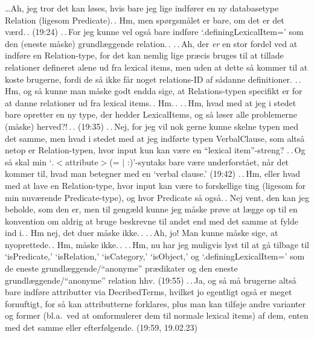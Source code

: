 \documentclass{report}
\begin{document}
\ldots Ah, jeg tror det kan løses, hvis bare jeg lige indfører en ny databasetype Relation (ligesom Predicate).\,. Hm, men spørgsmålet er bare, om det er det værd.\,. (19:24) .\,.\,For jeg kunne vel også bare indføre `.definingLexicalItem=' som den (eneste måske) grundlæggende relation.\,. .\,.\,Ah, der \emph{er} en stor fordel ved at indføre en Relation-type, for det kan nemlig lige præcis bruges til at tillade relationer defineret alene ud fra lexical items, men uden at dette så kommer til at koste brugerne, fordi de så ikke får noget relations-ID af sådanne definitioner. .\,.\,Hm, og så kunne man måske godt endda sige, at Relations-typen specifikt er for at danne relationer ud fra lexical items.\,. Hm.\,. .\,.\,Hm, hvad med at jeg i stedet bare opretter en ny type, der hedder LexicalItems, og så løser alle problemerne (måske) herved?!\,.\,. (19:35) .\,.\,Nej, for jeg vil nok gerne kunne skelne typen med det samme, men hvad i stedet med at jeg indførte typen VerbalClause, som altså netop er Relation-typen, hvor input kun kan være en ``lexical item''-streng? .\,.\,Og så skal min `$.<$attribute$>$(= $|$ :)'-syntaks bare være underforstået, når det kommer til, hvad man betegner med en `verbal clause.' (19:42) .\,.\,Hm, eller hvad med at lave en Relation-type, hvor input kan være to forskellige ting (ligesom for min nuværende Predicate-type), og hvor Predicate så også.\,. Nej vent, den kan jeg beholde, som den er, men til gengæld kunne jeg måske prøve at lægge op til en konvention om aldrig at bruge beskrevne til andet end med det samme at fylde ind i.\,. Hm nej, det duer måske ikke.\,. .\,.\,Ah, jo! Man kunne måske sige, at nyoprettede.\,. Hm, måske ikke.\,. .\,.\,Hm, nu har jeg muligvis lyst til at gå tilbage til `isPredicate,' `isRelation,' `isCategory,' `isObject,' og `.definingLexicalItem=' som de eneste grundlæggende/``anonyme'' prædikater og den eneste grundlæggende/``anonyme'' relation hhv. (19:55) .\,.\,Ja, og så må brugerne altså bare indføre attributter via DecribedTerms, hvilket jo egentligt også er meget fornuftigt, for så kan attributterne forklares, plus man kan tilføje andre varianter og former (bl.a.\ ved at omformulerer dem til normale lexical items) af dem, enten med det samme eller efterfølgende. (19:59, 19.02.23)
\end{document}

